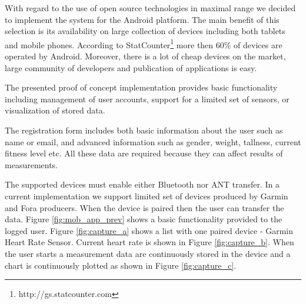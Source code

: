 \documentclass[a4paper,twoside]{article}
\begin{document}
With regard to the use of open source technologies in maximal range we decided to implement the system for the Android platform. The main benefit of this selection is its availability on large collection of devices including both tablets and mobile phones. According to StatCounter\footnote{http://gs.statcounter.com} more then 60\% of devices are operated by Android.   Moreover, there is a lot of cheap devices on the market, large community of developers and publication of applications is easy.

The presented proof of concept implementation provides basic functionality including management of user accounts,  support for a limited set of sensors, or visualization of stored data.

The registration form includes both basic information about the user such as name or email, and advanced information such as gender, weight, tallness, current fitness level etc. All these data are required because they can affect results of measurements.

The supported devices must enable either Bluetooth nor ANT transfer. In a current implementation we support limited set of devices produced by Garmin and Fora producers. When the device is paired then the user can transfer the data. Figure \ref{fig:mob_app_prev} shows a basic functionality provided to the logged user. Figure \ref{fig:capture_a} shows a list with one paired device - Garmin Heart Rate Sensor. Current heart rate is shown in Figure \ref{fig:capture_b}. When the user starts a measurement data are continuously stored in the device and a chart is continuously plotted as shown in Figure \ref{fig:capture_c}.
\end{document}
